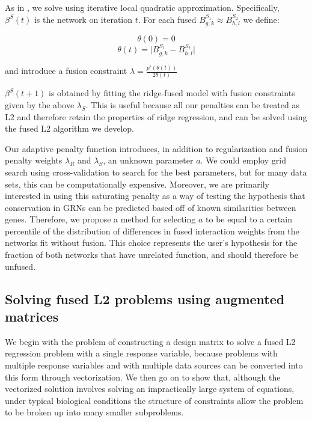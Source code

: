 \documentclass[11pt]{article}
\begin{document}

    
As in \cite{fan2001variable}, we solve using iterative local quadratic approximation. Specifically, $\beta^S(t)$ is the network on iteration $t$. For each fused $B^{S_1}_{g,k} \approx B^{S_2}_{h,l}$ we define:

\begin{equation} 
\theta(0)=0
\end{equation}
\begin{equation}
\theta(t) = \vert B^{S_1}_{g,k} - B^{S_2}_{h,l} \vert
\end{equation}

and introduce a fusion constraint $\lambda = \frac{p'(\theta(t))}{2\theta(t)} $

$\beta^S(t+1)$ is obtained by fitting the ridge-fused model with fusion constraints given by the above $\lambda_S$. This is useful because all our penalties can be treated as L2 and therefore retain the properties of ridge regression, and can be solved using the fused L2 algorithm we develop.

Our adaptive penalty function introduces, in addition to regularization and fusion penalty weights $\lambda_R$ and $\lambda_S$, an unknown parameter $a$. We could employ grid search using cross-validation to search for the best parameters, but for many data sets, this can be computationally expensive. Moreover, we are primarily interested in using this saturating penalty as a way of testing the hypothesis that conservation in GRNs can be predicted based off of known similarities between genes. Therefore, we propose a method for selecting $a$ to be equal to a certain percentile of the distribution of differences in fused interaction weights from the networks fit without fusion. This choice represents the user's hypothesis for the fraction of both networks that have unrelated function, and should therefore be unfused. 







\subsection{Solving fused L2 problems using augmented matrices}
We begin with the problem of constructing a design matrix to solve a fused L2 regression problem with a single response variable, because problems with multiple response variables and with multiple data sources can be converted into this form through vectorization. We then go on to show that, although the vectorized solution involves solving an impractically large system of equations, under typical biological conditions the structure of constraints allow the problem to be broken up into many smaller subproblems. 
\end{document}
